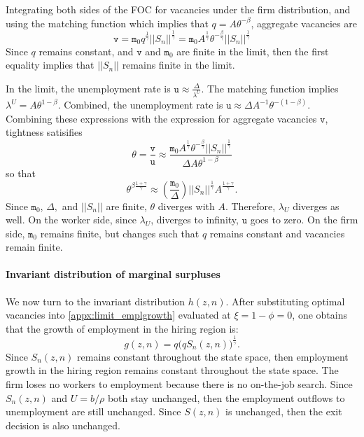 Integrating both sides of the FOC for vacancies under the firm distribution, and using the matching function which implies that $q = A\theta^{-\beta}$, aggregate vacancies are
\[
\mathtt{v}=\mathtt{m}_{0}q^{\frac{1}{\gamma}}||S_{n}||^{\frac{1}{\gamma}} = \mathtt{m}_{0}A^{\frac{1}{\gamma}}\theta^{-\frac{\beta}{\gamma}}||S_{n}||^{\frac{1}{\gamma}}
\]%
Since $q$ remains constant, and $\mathtt{v}$ and $\mathtt{m}_{0}$ are finite in the limit, then the first equality implies that $||S_{n}||$ remains finite in the limit.

In the limit, the unemployment rate is $\mathtt{u}\approx \frac{\Delta }{\lambda ^{U}}$.
The matching function implies $\lambda^U = A\theta^{1-\beta}$.
Combined, the unemployment rate is $\mathtt{u}\approx \Delta A^{-1}\theta^{-(1-\beta)}$.
Combining these expressions with the expression for aggregate vacancies $\mathtt{v}$, tightness satisifies
\begin{equation*}
\theta = \frac{\texttt{v}}{\texttt{u}}
\approx
\frac{\mathtt{m}_0 A^{\frac{1}{\gamma}} \theta^{-\frac{\beta}{\gamma}} ||S_n||^{\frac{1}{\gamma}}}{\Delta A \theta^{1-\beta}}
\end{equation*}
so that
\begin{equation*}
\theta^{\beta \frac{1+\gamma }{\gamma }}\approx \left(\frac{\mathtt{m}_{0}}{\Delta}\right)||S_{n}||^{\frac{1}{\gamma}} A^{\frac{1+\gamma}{\gamma }}.
\end{equation*}
Since $\mathtt{m}_{0}$, $\Delta ,$ and $||S_{n}||$ are finite, $\theta $ diverges with $A$.
Therefore, $\lambda_{U}$ diverges as well.
On the worker side, since $\lambda_U$, diverges to infinity, $\mathtt{u}$ goes to zero.
On the firm side, $\mathtt{m}_0$ remains finite, but changes such that $q$ remains constant and vacancies remain finite.

\paragraph{Invariant distribution of marginal surpluses}
We now turn to the invariant distribution $h(z,n)$.
After substituting optimal vacancies into \eqref{appx:limit_emplgrowth} evaluated at $\xi=1-\phi =0$, one obtains that the growth of employment in the hiring region
is:
\[
g(z,n)=q\Big(qS_{n}(z,n)\Big)^{\frac{1}{\gamma}}.
\]%
Since $S_n(z,n)$ remains constant throughout the state space, then employment growth in the hiring region remains constant throughout the state space.
The firm loses no workers to employment because there is no on-the-job search. Since $S_n(z,n)$ and $U = b/\rho$ both stay unchanged, then the employment outflows to unemployment are still unchanged.
Since $S(z,n)$ is unchanged, then the exit decision is also unchanged.

